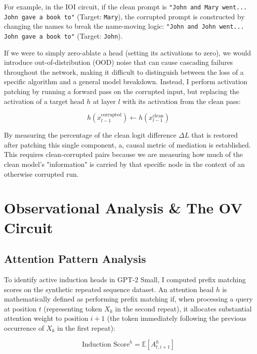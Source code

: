 \documentclass[11pt]{article}
\begin{document}
For example, in the IOI circuit, if the clean prompt is \texttt{"John and Mary went... John gave a book to"} (Target: \texttt{Mary}), the corrupted prompt is constructed by changing the names to break the name-moving logic: \texttt{"John and John went... John gave a book to"} (Target: \texttt{John}).

If we were to simply zero-ablate a head (setting its activations to zero), we would introduce out-of-distribution (OOD) noise that can cause cascading failures throughout the network, making it difficult to distinguish between the loss of a specific algorithm and a general model breakdown. Instead, I perform activation patching by running a forward pass on the corrupted input, but replacing the activation of a target head $h$ at layer $l$ with its activation from the clean pass:

\begin{equation}
    h(x^{\text{corrupted}}_{l-1}) \leftarrow h(x^{\text{clean}}_{l-1})
\end{equation}

By measuring the percentage of the clean logit difference $\Delta L$ that is restored after patching this single component, a, causal metric of mediation is established. This requires clean-corrupted pairs because we are measuring how much of the clean model's "information" is carried by that specific node in the context of an otherwise corrupted run.
\section{Observational Analysis \& The OV Circuit}

\subsection{Attention Pattern Analysis}

To identify active induction heads in GPT-2 Small, I computed prefix matching scores on the synthetic repeated sequence dataset. An attention head $h$ is mathematically defined as performing prefix matching if, when processing a query at position $t$ (representing token $X_k$ in the second repeat), it allocates substantial attention weight to position $i+1$ (the token immediately following the previous occurrence of $X_k$ in the first repeat):

\begin{equation}
    \text{Induction Score}^h = \mathbb{E} \left[ A^h_{t, i+1} \right]
\end{equation}
\end{document}

